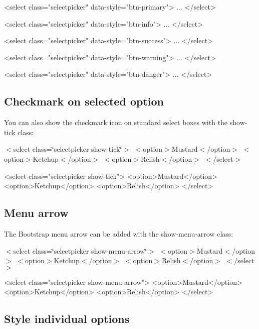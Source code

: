 \begin{DoxyCode}
<select class="selectpicker" data-style="btn-primary">
  ...
</select>

<select class="selectpicker" data-style="btn-info">
  ...
</select>

<select class="selectpicker" data-style="btn-success">
  ...
</select>

<select class="selectpicker" data-style="btn-warning">
  ...
</select>

<select class="selectpicker" data-style="btn-danger">
  ...
</select>
\end{DoxyCode}


\subsection*{Checkmark on selected option}

You can also show the checkmark icon on standard select boxes with the {\ttfamily show-\/tick} class\+:

 $<$select class=\char`\"{}selectpicker show-\/tick\char`\"{}$>$ $<$option$>$Mustard$<$/option$>$ $<$option$>$Ketchup$<$/option$>$ $<$option$>$Relish$<$/option$>$ $<$/select$>$ 


\begin{DoxyCode}
<select class="selectpicker show-tick">
  <option>Mustard</option>
  <option>Ketchup</option>
  <option>Relish</option>
</select>
\end{DoxyCode}


\subsection*{Menu arrow}

The Bootstrap menu arrow can be added with the {\ttfamily show-\/menu-\/arrow} class\+:

 $<$select class=\char`\"{}selectpicker show-\/menu-\/arrow\char`\"{}$>$ $<$option$>$Mustard$<$/option$>$ $<$option$>$Ketchup$<$/option$>$ $<$option$>$Relish$<$/option$>$ $<$/select$>$ 


\begin{DoxyCode}
<select class="selectpicker show-menu-arrow">
  <option>Mustard</option>
  <option>Ketchup</option>
  <option>Relish</option>
</select>
\end{DoxyCode}


\subsection*{Style individual options}

